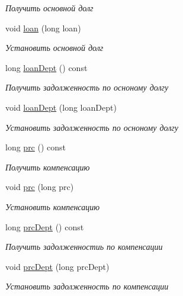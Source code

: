 \begin{DoxyCompactItemize}
\begin{DoxyCompactList}\small\item\em Получить основной долг \end{DoxyCompactList}\item 
void \hyperlink{classkpk_1_1data_1_1_loan_oper_value_ab5e5d0809777c84ba37e4799e5049441}{loan} (long loan)
\begin{DoxyCompactList}\small\item\em Установить основной долг \end{DoxyCompactList}\item 
long \hyperlink{classkpk_1_1data_1_1_loan_oper_value_a7bf3672ba4a76178c9ac56c9bfb7d41c}{loan\+Dept} () const 
\begin{DoxyCompactList}\small\item\em Получить задолженность по осноному долгу \end{DoxyCompactList}\item 
void \hyperlink{classkpk_1_1data_1_1_loan_oper_value_a3018a5c77b71f5cbf7b770a63d619c8b}{loan\+Dept} (long loan\+Dept)
\begin{DoxyCompactList}\small\item\em Установить задолженность по осноному долгу \end{DoxyCompactList}\item 
long \hyperlink{classkpk_1_1data_1_1_loan_oper_value_a73063afb20f403339b47a1459b5cf0e8}{prc} () const 
\begin{DoxyCompactList}\small\item\em Получить компенсацию \end{DoxyCompactList}\item 
void \hyperlink{classkpk_1_1data_1_1_loan_oper_value_aeb8f5417e33bedd2ad4fa5af05265be6}{prc} (long prc)
\begin{DoxyCompactList}\small\item\em Установить компенсацию \end{DoxyCompactList}\item 
long \hyperlink{classkpk_1_1data_1_1_loan_oper_value_a4ec5046e4e88a88d1fe753c8f4767f79}{prc\+Dept} () const 
\begin{DoxyCompactList}\small\item\em Получить задолженностиь по компенсации \end{DoxyCompactList}\item 
void \hyperlink{classkpk_1_1data_1_1_loan_oper_value_a4c054186ad90a49951ae2a4ee9d29331}{prc\+Dept} (long prc\+Dept)
\begin{DoxyCompactList}\small\item\em Установить задолженность по компенсации \end{DoxyCompactList}\item 

\end{DoxyCompactItemize}
